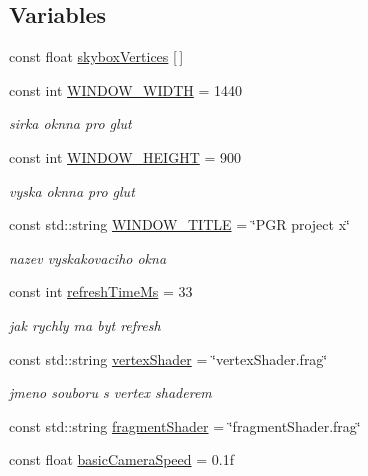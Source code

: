 \subsection*{Variables}
\begin{DoxyCompactItemize}
\item 
const float \mbox{\hyperlink{namespacekrizpav6_ac0b7dc3c1575364991659301e93ac917}{skybox\+Vertices}} \mbox{[}$\,$\mbox{]}
\item 
const int \mbox{\hyperlink{namespacekrizpav6_ac1e06653bf2ce46f48d6eb481d133cf7}{W\+I\+N\+D\+O\+W\+\_\+\+W\+I\+D\+TH}} = 1440
\begin{DoxyCompactList}\small\item\em sirka oknna pro glut \end{DoxyCompactList}\item 
const int \mbox{\hyperlink{namespacekrizpav6_a2313e1f501c5b7fb52ad5829054c4c50}{W\+I\+N\+D\+O\+W\+\_\+\+H\+E\+I\+G\+HT}} = 900
\begin{DoxyCompactList}\small\item\em vyska oknna pro glut \end{DoxyCompactList}\item 
const std\+::string \mbox{\hyperlink{namespacekrizpav6_a3478998e0f4100e6f5aaf6f26180004a}{W\+I\+N\+D\+O\+W\+\_\+\+T\+I\+T\+LE}} = \char`\"{}P\+GR project x\char`\"{}
\begin{DoxyCompactList}\small\item\em nazev vyskakovaciho okna \end{DoxyCompactList}\item 
const int \mbox{\hyperlink{namespacekrizpav6_a66babf7c7765b82dbcea7471e2455f19}{refresh\+Time\+Ms}} = 33
\begin{DoxyCompactList}\small\item\em jak rychly ma byt refresh \end{DoxyCompactList}\item 
const std\+::string \mbox{\hyperlink{namespacekrizpav6_a4f2044c6c1b0a084461ed44c4e5fb4ee}{vertex\+Shader}} = \char`\"{}vertex\+Shader.\+frag\char`\"{}
\begin{DoxyCompactList}\small\item\em jmeno souboru s vertex shaderem \end{DoxyCompactList}\item 
const std\+::string \mbox{\hyperlink{namespacekrizpav6_a50e22c82dc47d9874f8c3e68494c937d}{fragment\+Shader}} = \char`\"{}fragment\+Shader.\+frag\char`\"{}
\item 
const float \mbox{\hyperlink{namespacekrizpav6_a121fd2aa12343a58b6ef6013ce3e2e13}{basic\+Camera\+Speed}} = 0.\+1f

\end{DoxyCompactItemize}
